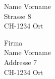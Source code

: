 \documentclass[12pt]{scrartcl}
\begin{document}
Name Vorname \\
Strasse 8 \\ 
CH-1234 Ort
 
\vspace*{3cm}
\hspace*{12cm}
\parbox{6cm}{
Firma \\ 
Name Vorname \\ 
Addresse 7 \\
CH-1234 Ort 
 }
 
\end{document}

